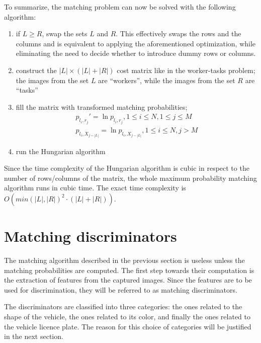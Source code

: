 \documentclass[times, utf8, zavrsni]{fer}
\begin{document}
To summarize, the matching problem can now be solved with the following
algorithm:
\begin{enumerate}
  \item if $L \geq R$, swap the sets $L$ and $R$. This effectively swaps the
  rows and the columns and is equivalent to applying the aforementioned
  optimization, while eliminating the need to decide whether to introduce
  dummy rows or columns.
  \item construct the $|L| \times (|L| + |R|)$ cost matrix like in the
  worker-tasks problem; the images from the set $L$ are ``workers'', while the images from the set $R$ are ``tasks''
  \item fill the matrix with transformed matching probabilities;
  \begin{displaymath}
  \begin{array}{lr}
    p_{l_i, r_j}' = \ln p_{l_i, r_j}, 1 \leq i \leq N, 1 \leq j \leq M \\
    p_{l_i, X_{j - |L|}} = \ln p_{l_i, X_{j - |L|}}, 1 \leq i \leq N, j > M
  \end{array}
  \end{displaymath}
  \item run the Hungarian algorithm
\end{enumerate}

Since the time complexity of the Hungarian algorithm is cubic in respect to the
number of rows/columns of the matrix, the whole maximum probability matching
algorithm runs in cubic time. The exact time complexity is $O(min(|L|, |R|)^2
\cdot (|L| + |R|))$.

\section{Matching discriminators}
\label{section:matching-discriminators}

The matching algorithm described in the previous section is useless unless the
matching probabilities are computed. The first step towards their computation
is the extraction of features from the captured images. Since the features are
to be used for discrimination, they will be referred to as matching
discriminators.

The discriminators are classified into three categories: the ones related to
the shape of the vehicle, the ones related to its color, and finally the ones
related to the vehicle licence plate. The reason for this choice of categories
will be justified in the next section.
\end{document}
